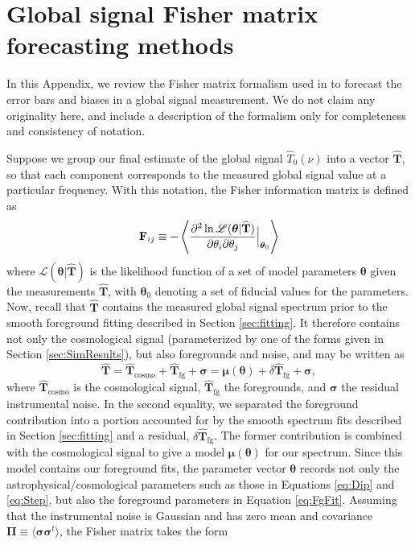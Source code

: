 \documentclass[twocolumn,apj,numberedappendix]{emulateapj}
\newcommand{\F}{\mathbf{F}}
\begin{document}
\section{Global signal Fisher matrix forecasting methods}
\label{fisher}
In this Appendix, we review the Fisher matrix formalism used in \citet{BernardiLEDA} to forecast the error bars and biases in a global signal measurement. We do not claim any originality here, and include a description of the formalism only for completeness and consistency of notation.

Suppose we group our final estimate of the global signal $\widehat{T}_0 (\nu)$ into a vector $\widehat{\mathbf{T}}$, so that each component corresponds to the measured global signal value at a particular frequency. With this notation, the Fisher information matrix is defined as
\begin{equation}
\F_{ij} \equiv -\left \langle \frac{\partial^2 \ln \mathscr{L}(\boldsymbol \theta | \widehat{\mathbf{T}})}{\partial \theta_i \partial \theta_j} \Big{|}_{\boldsymbol \theta_0} \right \rangle
\end{equation}
where $\mathscr{L}(\boldsymbol \theta | \widehat{\mathbf{T}})$ is the likelihood function of a set of model parameters $\boldsymbol \theta$ given the measurements $\widehat{\mathbf{T}}$, with $\boldsymbol \theta_0$ denoting a set of fiducial values for the parameters. Now, recall that $\widehat{\mathbf{T}}$ contains the measured global signal spectrum prior to the smooth foreground fitting described in Section \ref{sec:fitting}. It therefore contains not only the cosmological signal (parameterized by one of the forms given in Section \ref{sec:SimResults}), but also foregrounds and noise, and may be written as
\begin{equation}
\widehat{\mathbf{T}}= \widehat{\mathbf{T}} _\textrm{cosmo} + \widehat{\mathbf{T}}_\textrm{fg} + \boldsymbol \sigma = \boldsymbol \mu (\boldsymbol \theta) +\delta \widehat{\mathbf{T}}_\textrm{fg} + \boldsymbol \sigma,
\end{equation}
where $\widehat{\mathbf{T}} _\textrm{cosmo}$ is the cosmological signal, $\widehat{\mathbf{T}}_\textrm{fg}$ the foregrounds, and $\boldsymbol \sigma$ the residual instrumental noise. In the second equality, we separated the foreground contribution into a portion accounted for by the smooth spectrum fits described in Section \ref{sec:fitting} and a residual, $\delta \widehat{\mathbf{T}}_\textrm{fg}$. The former contribution is combined with the cosmological signal to give a model $\boldsymbol \mu (\boldsymbol \theta)$ for our spectrum. Since this model contains our foreground fits, the parameter vector $\boldsymbol \theta$ records not only the astrophysical/cosmological parameters such as those in Equations \eqref{eq:Dip} and \eqref{eq:Step}, but also the foreground parameters in Equation \eqref{eq:FgFit}. Assuming that the instrumental noise is Gaussian and has zero mean and covariance $\boldsymbol \Pi \equiv \langle \boldsymbol \sigma \boldsymbol \sigma^t \rangle$, the Fisher matrix takes the form
\end{document}
